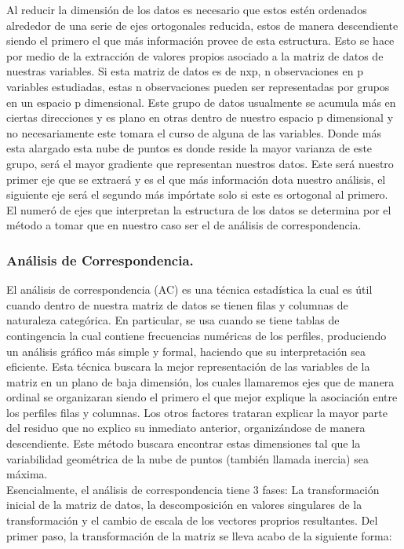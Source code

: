 Al reducir la dimensión de los datos es necesario que estos estén
ordenados alrededor de una serie de ejes ortogonales reducida, estos de
manera descendiente siendo el primero el que más información provee de
esta estructura. Esto se hace por medio de la extracción de valores
propios asociado a la matriz de datos de nuestras variables. Si esta
matriz de datos es de nxp, n observaciones en p variables estudiadas,
estas n observaciones pueden ser representadas por grupos en un espacio
p dimensional. Este grupo de datos usualmente se acumula más en ciertas
direcciones y es plano en otras dentro de nuestro espacio p dimensional
y no necesariamente este tomara el curso de alguna de las variables.
Donde más esta alargado esta nube de puntos es donde reside la mayor
varianza de este grupo, será el mayor gradiente que representan nuestros
datos. Este será nuestro primer eje que se extraerá y es el que más
información dota nuestro análisis, el siguiente eje será el segundo más
impórtate solo si este es ortogonal al primero. El numeró de ejes que
interpretan la estructura de los datos se determina por el método a
tomar que en nuestro caso ser el de análisis de correspondencia.

\hypertarget{anuxe1lisis-de-correspondencia.}{%
\subsubsection{Análisis de
Correspondencia.}\label{anuxe1lisis-de-correspondencia.}}

El análisis de correspondencia (AC) es una técnica estadística la cual
es útil cuando dentro de nuestra matriz de datos se tienen filas y
columnas de naturaleza categórica. En particular, se usa cuando se tiene
tablas de contingencia la cual contiene frecuencias numéricas de los
perfiles, produciendo un análisis gráfico más simple y formal, haciendo
que su interpretación sea eficiente. Esta técnica buscara la mejor
representación de las variables de la matriz en un plano de baja
dimensión, los cuales llamaremos ejes que de manera ordinal se
organizaran siendo el primero el que mejor explique la asociación entre
los perfiles filas y columnas. Los otros factores trataran explicar la
mayor parte del residuo que no explico su inmediato anterior,
organizándose de manera descendiente. Este método buscara encontrar
estas dimensiones tal que la variabilidad geométrica de la nube de
puntos (también llamada inercia) sea máxima.\\
Esencialmente, el análisis de correspondencia tiene 3 fases: La
transformación inicial de la matriz de datos, la descomposición en
valores singulares de la transformación y el cambio de escala de los
vectores proprios resultantes. Del primer paso, la transformación de la
matriz se lleva acabo de la siguiente forma:

